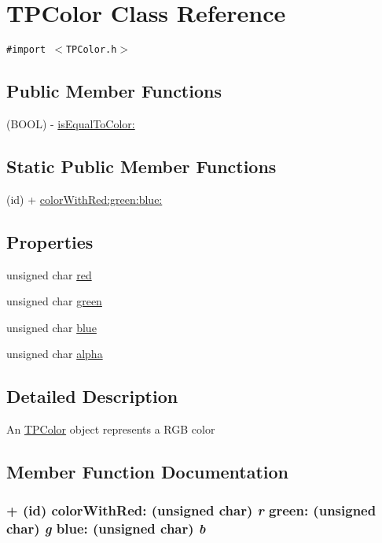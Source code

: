 \hypertarget{interface_t_p_color}{
\section{TPColor Class Reference}
\label{interface_t_p_color}
}
{\tt \#import $<$TPColor.h$>$}

\subsection*{Public Member Functions}
\begin{CompactItemize}
\item 
(BOOL) - \hyperlink{interface_t_p_color_ddcd99b87a88f0b5f2c678f9cb4d0737}{isEqualToColor:}
\end{CompactItemize}
\subsection*{Static Public Member Functions}
\begin{CompactItemize}
\item 
(id) + \hyperlink{interface_t_p_color_7985340e6fb29790992e2504611b8730}{colorWithRed:green:blue:}
\end{CompactItemize}
\subsection*{Properties}
\begin{CompactItemize}
\item 
unsigned char \hyperlink{interface_t_p_color_5b284d282ceddcbf24e37bb2bac9b217}{red}
\item 
unsigned char \hyperlink{interface_t_p_color_865eef9925aefb84be7b634757f1becb}{green}
\item 
unsigned char \hyperlink{interface_t_p_color_ab1912bec2407a73f0c27f3ba9a203d3}{blue}
\item 
unsigned char \hyperlink{interface_t_p_color_9fa955c7633315825a8c5c2edd77aebd}{alpha}
\end{CompactItemize}


\subsection{Detailed Description}
An \hyperlink{interface_t_p_color}{TPColor} object represents a RGB color 

\subsection{Member Function Documentation}
\hypertarget{interface_t_p_color_7985340e6fb29790992e2504611b8730}{
\subsubsection[{colorWithRed:green:blue:}]{\setlength{\rightskip}{0pt plus 5cm}+ (id) colorWithRed: (unsigned char) {\em r}\/ green: (unsigned char) {\em g}\/ blue: (unsigned char) {\em b}}}
\label{interface_t_p_color_7985340e6fb29790992e2504611b8730}


